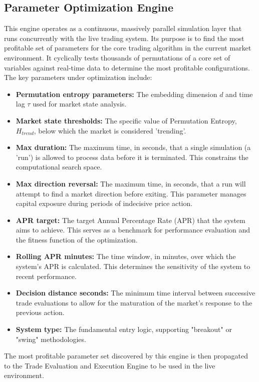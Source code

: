 \documentclass[11pt]{article}
\begin{document}
\subsection{Parameter Optimization Engine}
This engine operates as a continuous, massively parallel simulation layer that runs concurrently with the live trading system. Its purpose is to find the most profitable set of parameters for the core trading algorithm in the current market environment. It cyclically tests thousands of permutations of a core set of variables against real-time data to determine the most profitable configurations. The key parameters under optimization include:
\begin{itemize}
    \item \textbf{Permutation entropy parameters:} The embedding dimension $d$ and time lag $\tau$ used for market state analysis.
    \item \textbf{Market state thresholds:} The specific value of Permutation Entropy, $H_{trend}$, below which the market is considered 'trending'.
    \item \textbf{Max duration:} The maximum time, in seconds, that a single simulation (a 'run') is allowed to process data before it is terminated. This constrains the computational search space.
    \item \textbf{Max direction reversal:} The maximum time, in seconds, that a run will attempt to find a market direction before exiting. This parameter manages capital exposure during periods of indecisive price action.
    \item \textbf{APR target:} The target Annual Percentage Rate (APR) that the system aims to achieve. This serves as a benchmark for performance evaluation and the fitness function of the optimization.
    \item \textbf{Rolling APR minutes:} The time window, in minutes, over which the system's APR is calculated. This determines the sensitivity of the system to recent performance.
    \item \textbf{Decision distance seconds:} The minimum time interval between successive trade evaluations to allow for the maturation of the market's response to the previous action.
    \item \textbf{System type:} The fundamental entry logic, supporting "breakout" or "swing" methodologies.
\end{itemize}
The most profitable parameter set discovered by this engine is then propagated to the Trade Evaluation and Execution Engine to be used in the live environment.
\end{document}

